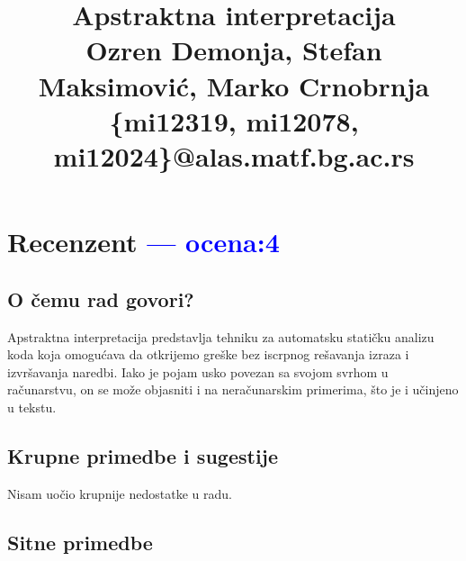 \documentclass[a4paper]{report}
\newcommand{\odgovor}[1]{\textcolor{blue}{#1}}
\begin{document}
\title{Apstraktna interpretacija\\ \small{Ozren Demonja, Stefan Maksimović, Marko Crnobrnja\\ \{mi12319, mi12078, mi12024\}@alas.matf.bg.ac.rs}}

\maketitle

\tableofcontents

\chapter{Recenzent \odgovor{--- ocena:4} }


\section{O čemu rad govori?}

Apstraktna interpretacija predstavlja tehniku za automatsku statičku analizu koda koja omogućava da otkrijemo greške bez iscrpnog rešavanja izraza i izvršavanja naredbi. Iako je pojam usko povezan sa svojom svrhom u računarstvu, on se može objasniti i na neračunarskim primerima, što je i učinjeno u tekstu.
\section{Krupne primedbe i sugestije}
Nisam uočio krupnije nedostatke u radu.
\section{Sitne primedbe}
\end{document}
